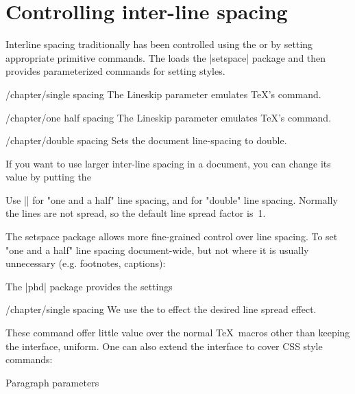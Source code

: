 \section{Controlling inter-line spacing}
Interline spacing traditionally has been controlled using the  or by setting appropriate primitive \tex commands. The  loads the |setspace| package and then provides parameterized commands for setting styles. 

\begin{key}{/chapter/single spacing} 
	The Lineskip parameter emulates \TeX's \cmd{\parindent} command.
\end{key}
\begin{key}{/chapter/one half spacing} 
	The Lineskip parameter emulates \TeX's \cmd{\parindent} command.
\end{key}
\begin{key}{/chapter/double spacing} 
	Sets the document line-spacing to double.
\end{key}

If you want to use larger inter-line spacing in a document, you can change its value by putting the

\CMDI{\linespread} Use |\linespread{1.3}| for "one and a half" line spacing, and \linespread{1.6} for "double" line spacing. Normally the lines are not spread, so the default line spread factor is~1.

The setspace package allows more fine-grained control over line spacing. To set "one and a half" line spacing document-wide, but not where it is usually unnecessary (e.g. footnotes, captions):

\begin{teXXX}
\usepackage{setspace}
\onehalfspacing
\end{teXXX}

The |phd| package provides the settings

\begin{key}{/chapter/single spacing}
We use the  to effect the desired line spread effect.
\end{key}


These command offer little value over the normal \TeX\ macros other than keeping the interface, uniform. One can also extend the interface to cover CSS style commands:

\begin{texexample}{Paragraph parameters}{}

\lipsum*[1]

\lipsum*[1]
\end{texexample}


